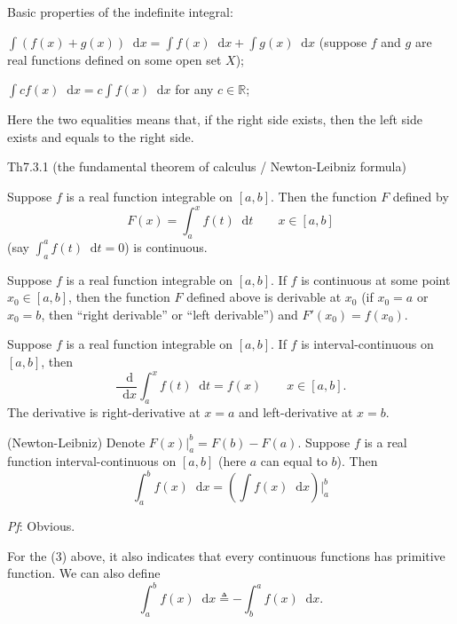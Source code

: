 \documentclass{article}
\newcommand{\dif}{\mathop{}\!\mathrm{d}}
\begin{document}
\begin{Rmk}{}
    \textcolor{Th}{Basic properties of the indefinite integral:
    \begin{compactenum}
        \item $\int \left(f(x) + g(x)\right) \dif x = \int f(x)\dif x + \int g(x)\dif x$ (suppose $f$ and $g$ are real functions defined on some open set $X$);
        \item $\int c f(x)\dif x = c\int f(x)\dif x$ for any $c\in\mathbb{R}$;
    \end{compactenum}
    Here the two equalities means that, if the right side exists, then the left side exists and equals to the right side.}
\end{Rmk}

\begin{Th}{Th7.3.1 (the fundamental theorem of calculus / Newton-Leibniz formula)}
    \begin{compactenum}
        \item Suppose $f$ is a real function integrable on $[a, b]$. Then the function $F$ defined by
            $$F(x) = \int_a^x f(t)\dif t \qquad x\in [a,b]$$
        (\textcolor{Df}{say $\int_a^a f(t)\dif t = 0$}) is continuous.
        \item Suppose $f$ is a real function integrable on $[a, b]$. If $f$ is continuous at some point $x_0\in[a, b]$, then the function $F$ defined above is derivable at $x_0$ (if $x_0 = a$ or $x_0 = b$, then ``right derivable'' or ``left derivable'') and $F'(x_0) = f(x_0)$.
        \item Suppose $f$ is a real function integrable on $[a, b]$. If $f$ is interval-continuous on $[a, b]$, then 
            $$\frac{\dif}{\dif x}\int_a^x f(t)\dif t = f(x) \qquad x\in [a, b].$$
        The derivative is right-derivative at $x=a$ and left-derivative at $x=b$.
        \item (Newton-Leibniz) \textcolor{Df}{Denote $F(x)\Big|_a^b = F(b)-F(a)$.} Suppose $f$ is a real function interval-continuous on $[a, b]$ (here $a$ can equal to $b$). Then
            $$\int_a^b f(x)\dif x = \left(\int f(x)\dif x\right)\Bigg|_a^b $$
    \end{compactenum}
    \tcblower
    \textit{Pf}: Obvious.
\end{Th}

\begin{Rmk}{}
    For the (3) above, it also indicates that \textcolor{Th}{every continuous functions has primitive function}. \textcolor{Df}{We can also define
    $$\int_a^b f(x)\dif x \triangleq -\int_b^a f(x)\dif x. $$}
\end{Rmk}
\end{document}
